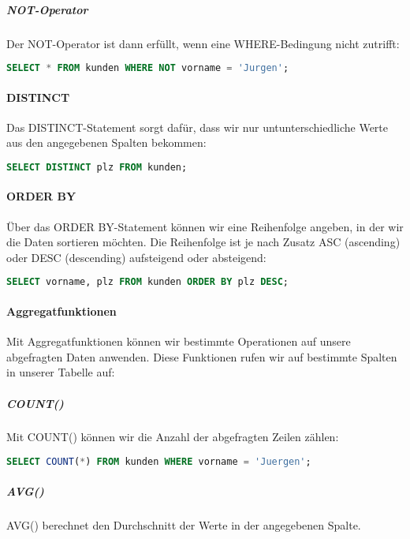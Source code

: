 \documentclass{article}
\begin{document}
	\subparagraph{NOT-Operator}
	Der NOT-Operator ist dann erfüllt, wenn eine WHERE-Bedingung nicht zutrifft:

	\begin{lstlisting}[language=SQL]
	SELECT * FROM kunden WHERE NOT vorname = 'Jurgen';
	\end{lstlisting}

	\paragraph{DISTINCT}
	Das DISTINCT-Statement sorgt dafür, dass wir nur untunterschiedliche Werte aus den angegebenen Spalten bekommen:

	\begin{lstlisting}[language=SQL, caption=Postleitzahlen aller Orte mit registrierten Kunden]
	SELECT DISTINCT plz FROM kunden;
	\end{lstlisting}

	\paragraph{ORDER BY}
	Über das ORDER BY-Statement können wir eine Reihenfolge angeben, in der wir die Daten sortieren möchten. Die Reihenfolge ist je nach Zusatz ASC (ascending) oder DESC (descending) aufsteigend oder absteigend:

	\begin{lstlisting}[language=SQL, caption=Vorname und PLZ aller Kunden absteigend sortiert anhand der PLZ]
	SELECT vorname, plz FROM kunden ORDER BY plz DESC;
	\end{lstlisting}

	\paragraph{Aggregatfunktionen}
	Mit Aggregatfunktionen können wir bestimmte Operationen auf unsere abgefragten Daten anwenden. Diese Funktionen rufen wir auf bestimmte Spalten in unserer Tabelle auf:

	\subparagraph{COUNT()}
	Mit COUNT() können wir die Anzahl der abgefragten Zeilen zählen:

	\begin{lstlisting}[language=SQL, caption=Anzahl aller Kunden mit dem Vornamen "Jürgen"]
	SELECT COUNT(*) FROM kunden WHERE vorname = 'Juergen';
	\end{lstlisting}

	\subparagraph{AVG()}
	AVG() berechnet den Durchschnitt der Werte in der angegebenen Spalte.
\end{document}
